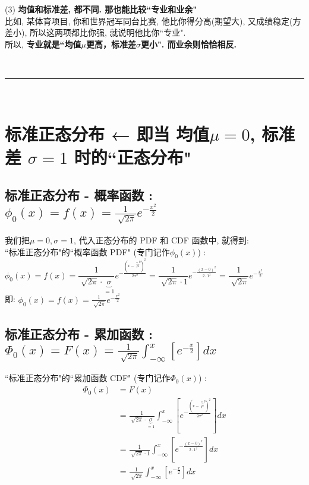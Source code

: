 \documentclass[UTF8]{ctexart}
\begin{document}
(3) \textbf{均值和标准差, 都不同. 那也能比较``专业和业余"} \\
比如, 某体育项目, 你和世界冠军同台比赛, 他比你得分高(期望大), 又成绩稳定(方差小), 所以这两项都比你强, 就说明他比你``专业". \\
所以, \textbf{专业就是``均值$\mu$更高，标准差$\sigma$更小". 而业余则恰恰相反. }


~\\
\hrule
~\\



\section{标准正态分布 ← 即当 均值$\mu=0$, 标准差 $\sigma=1$ 时的``正态分布"}


\subsection{标准正态分布 - 概率函数 : $\boxed{
		\phi _0(x)=f\left( x \right) =\frac{1}{\sqrt[]{2\pi}}e^{-\frac{x^2}{2}}		
	}$}


我们把$\mu=0, \sigma=1$, 代入正态分布的 PDF 和 CDF 函数中, 就得到: \\

``标准正态分布"的``概率函数 PDF" (专门记作$\phi _0(x)$) :\\
$
\phi _0(x)=f\left( x \right) =\dfrac{1}{\sqrt[]{2\pi}\cdot \underset{=1}{\underbrace{\sigma }}}e^{-\frac{(x-\overset{=0}{\overbrace{\mu }})^2}{2\sigma ^2}}
=\dfrac{1}{\sqrt[]{2\pi}\cdot 1}e^{-\frac{(x-0)^2}{2\cdot 1^2}}
=\dfrac{1}{\sqrt[]{2\pi}}e^{-\frac{x^2}{2}}
$ \\

即: 
 $\boxed{
	\phi _0(x)=f\left( x \right) =\frac{1}{\sqrt[]{2\pi}}e^{-\frac{x^2}{2}}		
}$


\vspace{1em} 
\subsection{标准正态分布 - 累加函数 :  $\boxed{
		\varPhi _0(x)=F\left( x \right) =\frac{1}{\sqrt[]{2\pi}}\int_{-\infty}^x{\left[ e^{-\frac{x}{2}} \right]}dx
	}$}
	

``标准正态分布"的``累加函数 CDF" (专门记作$\varPhi _0(x)$) :
\begin{align*}  %
	\varPhi _0(x) &=F\left( x \right)\\
&=\frac{1}{\sqrt[]{2\pi}\cdot \underset{=1}{\underbrace{\sigma }}}\int_{-\infty}^x{\left[ e^{-\frac{(x-\overset{=0}{\overbrace{\mu }})^2}{2\sigma ^2}} \right]}dx\\
&=\frac{1}{\sqrt[]{2\pi}\cdot 1}\int_{-\infty}^x{\left[ e^{-\frac{(x-0)^2}{2\cdot 1^2}} \right]}dx\\
&=\frac{1}{\sqrt[]{2\pi}}\int_{-\infty}^x{\left[ e^{-\frac{x}{2}} \right]}dx  
\end{align*}
\end{document}
